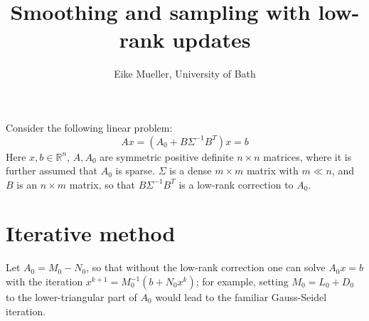 \documentclass[11pt]{article}
\title{Smoothing and sampling with low-rank updates}
\author{Eike Mueller, University of Bath}
\begin{document}
\maketitle
Consider the following linear problem:
\begin{equation}
    Ax = \left(A_0 + B \Sigma^{-1} B^T \right)x = b\label{eqn:linear_system}
\end{equation}
Here $x,b\in\mathbb{R}^n$, $A,A_0$ are symmetric positive definite $n\times n$ matrices, where it is further assumed that $A_0$ is sparse. $\Sigma$ is a dense $m\times m$ matrix with $m\ll n$, and $B$ is an $n\times m$ matrix, so that $B\Sigma^{-1}B^T$ is a low-rank correction to $A_0$.
\section{Iterative method}
Let $A_0 = M_0-N_0$, so that without the low-rank correction one can solve $A_0x=b$ with the iteration $x^{k+1} = M_0^{-1}(b + N_0x^k)$; for example, setting $M_0 = L_0 + D_0$ to the lower-triangular part of $A_0$ would lead to the familiar Gauss-Seidel iteration.
\end{document}
